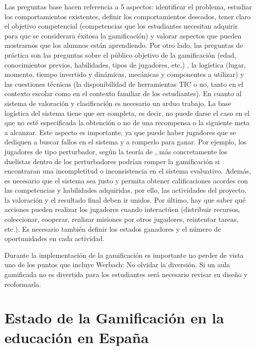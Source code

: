 Las preguntas base hacen referencia a 5 aspectos: identificar el problema, estudiar los comportamientos existentes, definir los comportamientos deseados, tener claro el objetivo competencial (competencias que los estudiantes necesitan adquirir para que se considerara éxitosa la gamificación) y valorar aspectos que pueden mostrarnos que los alumnos están aprendiendo.
%
Por otro lado, las preguntas de práctica son las preguntas sobre el público objetivo de la gamificación (edad, conocimientos previos, habilidades, tipos de jugadores, etc.) , la logística (lugar, momento, tiempo invertido y dinámicas, mecánicas y componentes a utilizar) y las cuestiones técnicas (la disponibilidad de herramientas TIC o no, tanto en el contexto escolar como en el contexto familiar de los estudiantes).
%
En cuanto al sistema de valoración y clasificación es necesario un arduo trabajo.
%
La base logística del sistema tiene que ser completa, es decir, no puede darse el caso en el que no esté especificada la obtención o no de una recompensa o la siguiente meta a alcanzar.
%
Este aspecto es importante, ya que puede haber jugadores que se dediquen a buscar fallos en el sistema y a romperlo para ganar.
%
Por ejemplo, los jugadores de tipo perturbador, según la teoría de  \citet{marczewski}, más concretamente los duelistas dentro de los perturbadores podrían romper la gamificación si encontraran una incompletitud o inconsistencia en el sistema evaluativo.
%
Además, es necesario que el sistema sea justo y permita obtener calificaciones acordes con las competencias y habilidades adquiridas, por ello, las actividades del proyecto, la valoración y el resultado final deben ir unidos.
%
Por último, hay que saber qué acciones pueden realizar los jugadores cuando interactúen (distribuir recursos, coleccionar, cooperar, realizar misiones por otros jugadores, reintentar tareas, etc.). 
%
Es necesario también definir los estados ganadores y el número de oportunidades en cada actividad.

Durante la implementación de la gamificación es importante no perder de vista uno de los puntos que incluye Werbach: No olvidar la diversión.
%
Si un aula gamificada no es divertida para los estudiantes será necesario revisar su diseño y reoformarla.


\section{Estado de la Gamificación en la educación en España}

